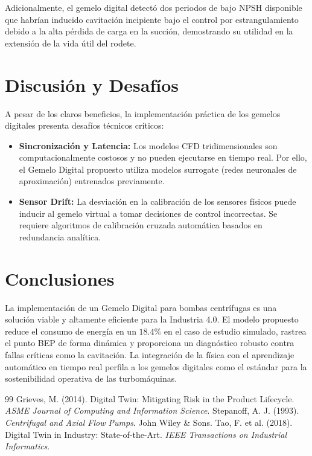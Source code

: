 \documentclass[11pt,twocolumn,a4paper]{article}
\begin{document}
Adicionalmente, el gemelo digital detectó dos periodos de bajo NPSH disponible que habrían inducido cavitación incipiente bajo el control por estrangulamiento debido a la alta pérdida de carga en la succión, demostrando su utilidad en la extensión de la vida útil del rodete.

\section{Discusión y Desafíos}
A pesar de los claros beneficios, la implementación práctica de los gemelos digitales presenta desafíos técnicos críticos:
\begin{itemize}
    \item \textbf{Sincronización y Latencia:} Los modelos CFD tridimensionales son computacionalmente costosos y no pueden ejecutarse en tiempo real. Por ello, el Gemelo Digital propuesto utiliza modelos surrogate (redes neuronales de aproximación) entrenados previamente.
    \item \textbf{Sensor Drift:} La desviación en la calibración de los sensores físicos puede inducir al gemelo virtual a tomar decisiones de control incorrectas. Se requiere algoritmos de calibración cruzada automática basados en redundancia analítica.
\end{itemize}

\section{Conclusiones}
La implementación de un Gemelo Digital para bombas centrífugas es una solución viable y altamente eficiente para la Industria 4.0. El modelo propuesto reduce el consumo de energía en un $18.4\%$ en el caso de estudio simulado, rastrea el punto BEP de forma dinámica y proporciona un diagnóstico robusto contra fallas críticas como la cavitación. La integración de la física con el aprendizaje automático en tiempo real perfila a los gemelos digitales como el estándar para la sostenibilidad operativa de las turbomáquinas.

\begin{thebibliography}{99}
 Grieves, M. (2014). Digital Twin: Mitigating Risk in the Product Lifecycle. \textit{ASME Journal of Computing and Information Science}.
 Stepanoff, A. J. (1993). \textit{Centrifugal and Axial Flow Pumps}. John Wiley \& Sons.
 Tao, F. et al. (2018). Digital Twin in Industry: State-of-the-Art. \textit{IEEE Transactions on Industrial Informatics}.
\end{thebibliography}
\end{document}
